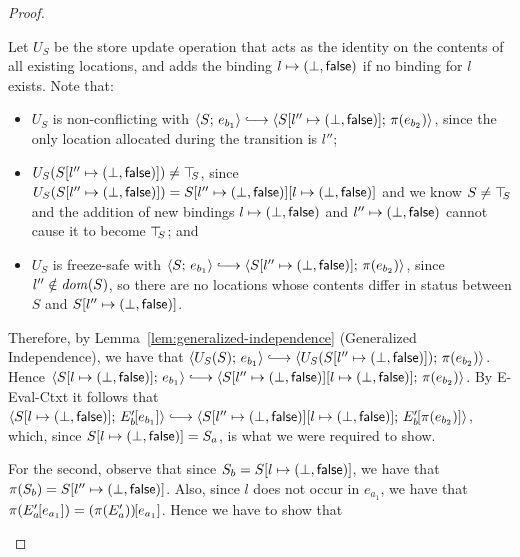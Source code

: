 \begin{proof}
\begin{enumerate}
\begin{enumerate}
\begin{itemize}
          Let $U_S$ be the store update operation that acts as the
          identity on the contents of all existing locations, and adds
          the binding $l \mapsto (\bot, \textsf{false})$ if no
          binding for $l$ exists.  Note that:
          \begin{itemize}
          \item $U_S$ is non-conflicting with $\config{S}{e_{b_1}}
            \parstepsto
            \config{\extS{S}{l''}{\bot}{\frozenfalse}}{\pi(e_{b_2})}$,
            since the only location allocated during the transition is
            $l''$;
          \item $U_S(S[l'' \mapsto (\bot, \textsf{false})]) \neq \top\hspace{-0.85mm}_{S}$,
            since $U_S(S[l'' \mapsto (\bot, \textsf{false})]) =
            S[l'' \mapsto (\bot, \textsf{false})][l \mapsto (\bot, \textsf{false})]$
            and we know $S \neq \top\hspace{-0.85mm}_{S}$ and the addition of new
            bindings $l \mapsto (\bot, \textsf{false})$ and
            $l'' \mapsto (\bot, \textsf{false})$ cannot cause it
            to become $\top\hspace{-0.85mm}_{S}$; and
          \item $U_S$ is freeze-safe with $\config{S}{e_{b_1}}
            \parstepsto
            \config{\extS{S}{l''}{\bot}{\frozenfalse}}{\pi(e_{b_2})}$,
            since $l'' \notin \mathit{dom}(S)$, so there are no locations
            whose contents differ in status between $S$ and
            $S[l'' \mapsto (\bot, \textsf{false})]$.
          \end{itemize}

          Therefore, by Lemma~\ref{lem:generalized-independence}
          (Generalized Independence), we have that
          $\config{U_S(S)}{e_{b_1}} \parstepsto
          \config{U_S(\extS{S}{l''}{\bot}{\frozenfalse})}{\pi(e_{b_2})}$.
          Hence $\config{\extS{S}{l}{\bot}{\frozenfalse}}{e_{b_1}}
          \parstepsto
          \config{\extS{\extS{S}{l''}{\bot}{\frozenfalse}}{l}{\bot}{\frozenfalse}}{\pi(e_{b_2})}$.
          By {\sc E-Eval-Ctxt} it follows that
          $\config{\extS{S}{l}{\bot}{\frozenfalse}}{\evalctxt{E'_b}{e_{b_1}}}
          \parstepsto
          \config{\extS{\extS{S}{l''}{\bot}{\frozenfalse}}{l}{\bot}{\frozenfalse}}{\evalctxt{E'_b}{\pi(e_{b_2})}}$,
          which, since $S[l \mapsto (\bot, \textsf{false})] = S_a$, is
          what we were required to show.

          For the second, observe that since $S_b =
          S[l \mapsto (\bot, \textsf{false})]$, we have that $\pi(S_b) =
          S[l'' \mapsto (\bot, \textsf{false})]$.  Also, since $l$ does not occur in
          $e_{a_1}$, we have that $\pi(E'_a\hspace{-1mm}\left[e_{a_1}\right]) =
          (\pi(E'_a))\hspace{-1mm}\left[e_{a_1}\right]$.  Hence we have to show that


\end{itemize}
\end{enumerate}
\end{enumerate}
\end{proof}
